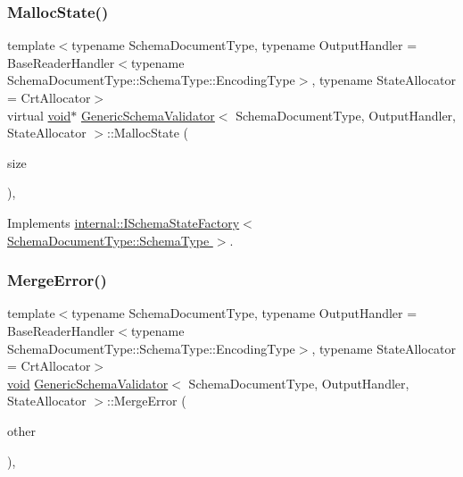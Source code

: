 \mbox{\label{classGenericSchemaValidator_a7c999dfb3118aaa08495d60eee6d3732}} 
\subsubsection{\texorpdfstring{Malloc\+State()}{MallocState()}}
{\footnotesize\ttfamily template$<$typename Schema\+Document\+Type, typename Output\+Handler = Base\+Reader\+Handler$<$typename Schema\+Document\+Type\+::\+Schema\+Type\+::\+Encoding\+Type$>$, typename State\+Allocator = Crt\+Allocator$>$ \\
virtual \hyperlink{imgui__impl__opengl3__loader_8h_ac668e7cffd9e2e9cfee428b9b2f34fa7}{void}$\ast$ \hyperlink{classGenericSchemaValidator}{Generic\+Schema\+Validator}$<$ Schema\+Document\+Type, Output\+Handler, State\+Allocator $>$\+::Malloc\+State (\begin{DoxyParamCaption}\item[{size\+\_\+t}]{size }\end{DoxyParamCaption})\hspace{0.3cm}{\ttfamily [inline]}, {\ttfamily [virtual]}}



Implements \hyperlink{classinternal_1_1ISchemaStateFactory_ada92ebf8e9ef994f7e20a0f7f9750519}{internal\+::\+I\+Schema\+State\+Factory$<$ Schema\+Document\+Type\+::\+Schema\+Type $>$}.

\mbox{\label{classGenericSchemaValidator_a55995260e5ef46a7b0706823d2985446}} 
\subsubsection{\texorpdfstring{Merge\+Error()}{MergeError()}}
{\footnotesize\ttfamily template$<$typename Schema\+Document\+Type, typename Output\+Handler = Base\+Reader\+Handler$<$typename Schema\+Document\+Type\+::\+Schema\+Type\+::\+Encoding\+Type$>$, typename State\+Allocator = Crt\+Allocator$>$ \\
\hyperlink{imgui__impl__opengl3__loader_8h_ac668e7cffd9e2e9cfee428b9b2f34fa7}{void} \hyperlink{classGenericSchemaValidator}{Generic\+Schema\+Validator}$<$ Schema\+Document\+Type, Output\+Handler, State\+Allocator $>$\+::Merge\+Error (\begin{DoxyParamCaption}\item[{\hyperlink{classGenericSchemaValidator_a435890a2dddeecb896d4ac76de03ca68}{Value\+Type} \&}]{other }\end{DoxyParamCaption})\hspace{0.3cm}{\ttfamily [inline]}, {\ttfamily [private]}}

